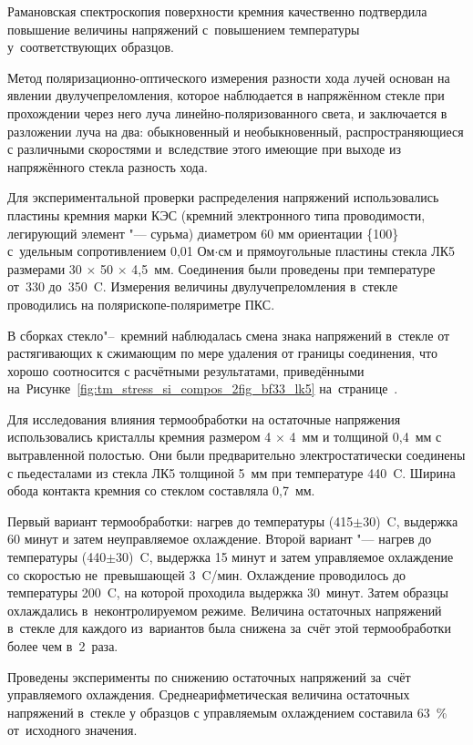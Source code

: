 Рамановская спектроскопия поверхности кремния качественно подтвердила
повышение величины напряжений с~повышением температуры
у~соответствующих образцов.

Метод поляризационно-оптического измерения разности хода лучей основан
на явлении двулучепреломления, которое наблюдается в напряжённом
стекле при прохождении через него луча линейно-поляризованного света,
и заключается в разложении луча на два: обыкновенный и необыкновенный,
распространяющиеся с различными скоростями и~вследствие этого имеющие
при выходе из напряжённого стекла разность хода.

Для экспериментальной проверки распределения напряжений
использовались пластины кремния марки КЭС (кремний электронного типа
проводимости, легирующий элемент "--- сурьма) диаметром 60 мм
ориентации \{100\} с~удельным сопротивлением 0,01 Ом$\cdot$см и
прямоугольные пластины стекла ЛК5 размерами 30\(\,\times\,\)50\(\,\times\,\)4,5~мм. Соединения были проведены при температуре от~330
до~350~{\textdegree}C. Измерения величины двулучепреломления в~стекле
проводились на полярископе\nb-поляриметре ПКС.

В сборках стекло"--~кремний наблюдалась смена знака напряжений в~стекле от
растягивающих к сжимающим по мере удаления от границы соединения, что хорошо
соотносится с расчётными результатами, приведёнными
на~Рисунке~\ref{fig:tm_stress_si_compos_2fig_bf33_lk5}
на~странице~\pageref{fig:tm_stress_si_compos_2fig_bf33_lk5}.

Для исследования влияния
термообработки на остаточные напряжения
использовались кристаллы кремния
размером 4\(\,\times\,\)4~мм и толщиной 0,4~мм с вытравленной полостью. Они были
предварительно электростатически соединены с пьедесталами из стекла ЛК5 толщиной
5~мм при температуре 440~{\textdegree}C. Ширина обода контакта
кремния со стеклом составляла 0,7~мм.

Первый вариант термообработки: нагрев до температуры
(415\(\pm\)30)~{\textdegree}C, выдержка 60 минут и затем неуправляемое охлаждение.
Второй вариант "--- нагрев до температуры
(440\(\pm\)30)~{\textdegree}C, выдержка 15 минут и затем управляемое охлаждение со
скоростью не~превышающей 3~{\textdegree}C/мин. Охлаждение проводилось до
температуры 200~{\textdegree}C, на которой проходила выдержка 30~минут. Затем
образцы охлаждались в~неконтролируемом режиме.
Величина остаточных напряжений в~стекле для каждого
из~вариантов была снижена за~счёт этой термообработки более чем в~2~раза.

Проведены эксперименты по снижению остаточных напряжений
за~счёт управляемого охлаждения.
Среднеарифметическая величина остаточных напряжений в~стекле
у образцов с управляемым охлаждением составила
63~\% от~исходного значения.

